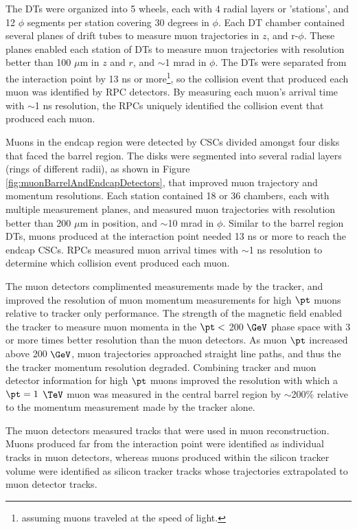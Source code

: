 The DTs were organized into 5 wheels, each with 4 radial layers or 'stations', and 12 $\phi$ segments per 
station covering 30 degrees in $\phi$.  Each DT chamber contained several planes of drift tubes to measure 
muon trajectories in $z$, and r-$\phi$.  These planes enabled each station of DTs to measure muon trajectories 
with resolution better than 100 $\mu$m in $z$ and $r$, and $\sim$1 mrad in $\phi$.  The DTs were separated 
from the interaction point by 13 ns or more\footnote{assuming muons traveled at the speed 
of light.}, so the collision event that produced each muon was identified by RPC detectors.  By measuring 
each muon's arrival time with $\sim$1 ns resolution, the RPCs uniquely identified the collision event that 
produced each muon.

Muons in the endcap region were detected by CSCs divided amongst four disks that faced the barrel region.  
The disks were segmented into several radial layers (rings of different radii), as shown in Figure \ref{fig:muonBarrelAndEndcapDetectors}, 
that improved muon trajectory and momentum resolutions.  Each station contained 18 or 36 
chambers, each with multiple measurement planes, and measured muon trajectories with resolution 
better than 200 $\mu$m in position, and $\sim$10 mrad in $\phi$.  Similar to the barrel region DTs, muons produced 
at the interaction point needed 13 ns or more to reach the endcap CSCs.  RPCs measured muon arrival times with $\sim$1 
ns resolution to determine which collision event produced each muon.

The muon detectors complimented measurements made by the tracker, and improved the resolution of muon 
momentum measurements for high $\pt$ muons relative to tracker only performance.  The 
strength of the magnetic field enabled the tracker to measure muon momenta in the $\pt <$ 
200 $\GeV$ phase space with 3 or more times better resolution than the muon detectors.  As muon $\pt$ increased 
above 200 $\GeV$, muon trajectories approached straight line paths, and thus the the tracker momentum resolution degraded.  
Combining tracker and muon detector information for high $\pt$ muons improved the resolution with which a 
$\pt = 1$ $\TeV$ muon was measured in the central barrel region by $\sim$200\% relative to the momentum 
measurement made by the tracker alone.

The muon detectors measured tracks that were used in muon reconstruction.  Muons produced far from the interaction 
point were identified as individual tracks in muon detectors, whereas muons produced within the silicon tracker 
volume were identified as silicon tracker tracks whose trajectories extrapolated to muon detector tracks.


